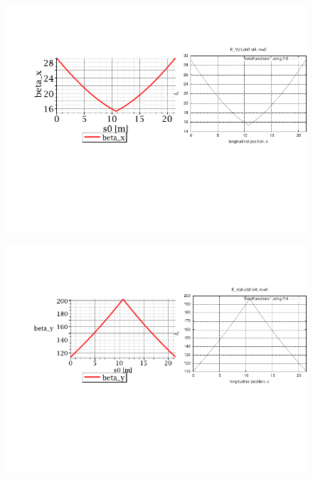 \documentclass[t]{beamer}
\begin{document}
\begin{frame}{}
\begin{figure}[h]
\centering
\includegraphics[]{Betax-figures.pdf}
\end{figure}

\begin{figure}
\centering
\includegraphics[]{Betay-figures.pdf}
\end{figure}
\end{frame}
\end{document}
